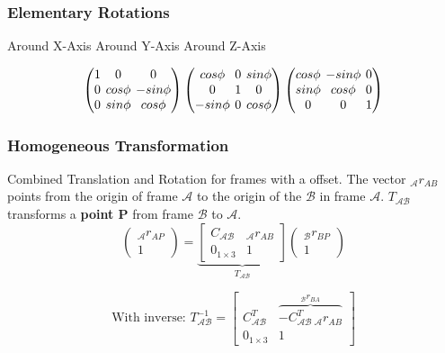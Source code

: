 \documentclass[fontsize=6pt,DIV=calc,a4paper,ngerman]{scrartcl}
\begin{document}
\begin{multicols*}{4}
	\subsubsection{Elementary Rotations}
	\begin{center}
		Around X-Axis \qquad Around Y-Axis \qquad Around Z-Axis
	\end{center}
	$$
		\setlength\arraycolsep{2pt} %
		\begin{pmatrix}
			1 & 0       & 0        \\
			0 & cos\phi & -sin\phi \\
			0 & sin\phi & cos\phi
		\end{pmatrix}
		\begin{pmatrix}
			cos\phi  & 0 & sin\phi \\
			0        & 1 & 0       \\
			-sin\phi & 0 & cos\phi
		\end{pmatrix}
		\begin{pmatrix}
			cos\phi & -sin\phi & 0 \\
			sin\phi & cos\phi  & 0 \\
			0       & 0        & 1
		\end{pmatrix}
	$$


	\subsubsection{Homogeneous Transformation}
	Combined Translation and Rotation for frames with a offset. The vector ${}_\mathcal{A}r_{AB}$ points from the origin of frame $\mathcal{A}$ to the origin of the $\mathcal{B}$ in frame $\mathcal{A}$. $T_\mathcal{AB}$ transforms a \textbf{point P} from frame $\mathcal{B}$ to $\mathcal{A}$.
	$$\begin{pmatrix}{}_\mathcal{A}r_{AP} \\ 1\end{pmatrix}= \underbrace{
			\begin{bmatrix}C_\mathcal{AB} & {}_\mathcal{A}r_{AB} \\
				0_{1\times3}   & 1
			\end{bmatrix}}_{T_\mathcal{AB}} \begin{pmatrix}
			{}_\mathcal{B}r_{BP} \\
			1
		\end{pmatrix}$$

	$$\text{With inverse: } T^{-1}_\mathcal{AB} = \left[\begin{smallmatrix}
				C_\mathcal{AB}^T & \overbrace{-C_\mathcal{AB}^T\,{}_\mathcal{A}r_{AB}}^{{}_\mathcal{B}r_{BA}} \\
				0_{1\times3} & 1
			\end{smallmatrix}\right]$$


\end{multicols*}
\end{document}
